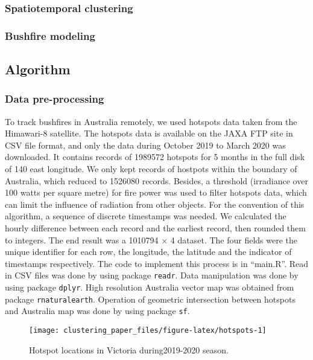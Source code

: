 \hypertarget{spatiotemporal-clustering}{%
\subsubsection{Spatiotemporal
clustering}\label{spatiotemporal-clustering}}

\hypertarget{bushfire-modeling}{%
\subsubsection{Bushfire modeling}\label{bushfire-modeling}}

\hypertarget{algorithm}{%
\subsection{Algorithm}\label{algorithm}}

\hypertarget{data-pre-processing}{%
\subsubsection{Data pre-processing}\label{data-pre-processing}}

To track bushfires in Australia remotely, we used hotspots data taken
from the Himawari-8 satellite. The hotspots data is available on the
JAXA FTP site in CSV file format, and only the data during October 2019
to March 2020 was downloaded. It contains records of 1989572 hotspots
for 5 months in the full disk of 140 \textdegree east longitude. We only
kept records of hostpots within the boundary of Australia, which reduced
to 1526080 records. Besides, a threshold (irradiance over 100 watts per
square metre) for fire power was used to filter hotspots data, which can
limit the influence of radiation from other objects. For the convention
of this algorithm, a sequence of discrete timestamps was needed. We
calculated the hourly difference between each record and the earliest
record, then rounded them to integers. The end result was a 1010794
\(\times\) 4 dataset. The four fields were the unique identifier for
each row, the longitude, the latitude and the indicator of timestamps
respectively. The code to implement this process is in ``main.R''. Read
in CSV files was done by using package \texttt{readr}. Data manipulation
was done by using package \texttt{dplyr}. High resolution Australia
vector map was obtained from package \texttt{rnaturalearth}. Operation
of geometric intersection between hotspots and Australia map was done by
using package \texttt{sf}.

\begin{Schunk}
\begin{figure}
\texttt{[image: clustering\_paper\_files/figure-latex/hotspots-1]} \caption[Hotspot locations in Victoria during2019-2020 season]{Hotspot locations in Victoria during2019-2020 season.}\label{fig:hotspots}
\end{figure}
\end{Schunk}

